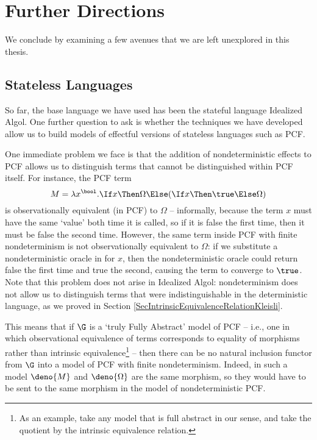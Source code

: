 \chapter{Further Directions}
\label{ChapFurtherDirections}

We conclude by examining a few avenues that we are left unexplored in this thesis.

\section{Stateless Languages}
\label{SecStatelessLanguages}

So far, the base language we have used has been the stateful language Idealized Algol.  
One further question to ask is whether the techniques we have developed allow us to build models of effectful versions of stateless languages such as PCF.

One immediate problem we face is that the addition of nondeterministic effects to PCF allows us to distinguish terms that cannot be distinguished within PCF itself.  
For instance, the PCF term
\[
  M = \lambda x^{\bool}.\If x \Then \Omega \Else (\If x \Then \true \Else \Omega)
  \]
is observationally equivalent (in PCF) to $\Omega$ -- informally, because the term $x$ must have the same `value' both time it is called, so if it is false the first time, then it must be false the second time.
However, the same term inside PCF with finite nondeterminism is not observationally equivalent to $\Omega$: if we substitute a nondeterministic oracle in for $x$, then the nondeterministic oracle could return false the first time and true the second, causing the term to converge to $\true$.
Note that this problem does not arise in Idealized Algol: nondeterminism does not allow us to distinguish terms that were indistinguishable in the deterministic language, as we proved in Section \ref{SecIntrinsicEquivalenceRelationKleisli}.

This means that if $\G$ is a `truly Fully Abstract' model of PCF -- i.e., one in which observational equivalence of terms corresponds to equality of morphisms rather than intrinsic equivalence\footnote{As an example, take any model that is full abstract in our sense, and take the quotient by the intrinsic equivalence relation.} -- then there can be no natural inclusion functor from $\G$ into a model of PCF with finite nondeterminism.  
Indeed, in such a model $\deno{M}$ and $\deno{\Omega}$ are the same morphism, so they would have to be sent to the same morphism in the model of nondeterministic PCF.

